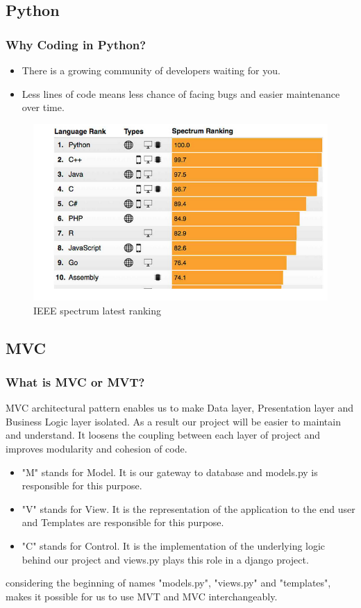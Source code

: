 \documentclass{beamer}
\begin{document}
\subsection{Python}
\begin{frame}
\frametitle{Why Coding in Python?}
\begin{itemize}
	\item There is a growing community of developers waiting for you.
	\item Less lines of code means less chance of facing bugs and easier maintenance over time.
\end{itemize}
\begin{figure}
	\includegraphics[width=0.7\linewidth]{Pics/python_ranking.png}
	\caption{IEEE spectrum latest ranking}
\end{figure}
\end{frame}

\subsection{MVC}
\begin{frame}
\frametitle{What is MVC or MVT?}
MVC architectural pattern enables us to make Data layer, Presentation layer and Business Logic layer isolated. As a result our project will be easier to maintain and understand. It loosens the coupling between each layer of project and improves modularity and cohesion of code.
\begin{block}

\begin{itemize}
	\item "M" stands for Model. It is our gateway to database and models.py is responsible for this purpose.
	\item "V" stands for View. It is the representation of the application to the end user and Templates are responsible for this purpose.
	\item "C" stands for Control. It is the implementation of the underlying logic behind our project and views.py plays this role in a django project.
\end{itemize}
\end{block}
	considering the beginning of names "models.py", "views.py" and "templates", makes it possible for us to use MVT and MVC interchangeably.
\end{frame}
\end{document}

